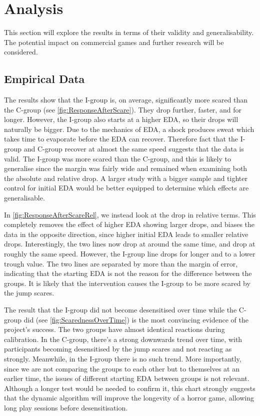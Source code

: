 \documentclass[12pt,a4paper]{article}\usepackage[]{graphicx}\usepackage[]{color}
\begin{document}
\section{Analysis}
\label{sec:Analysis}

This section will explore the results in terms of their validity and generalisability.
The potential impact on commercial games and further research will be considered.

\subsection{Empirical Data}

The results show that the I-group is, on average, significantly more scared than the C-group (see \vref{fig:ResponseAfterScare}).
They drop further, faster, and for longer.
However, the I-group also starts at a higher EDA, so their drops will naturally be bigger.
Due to the mechanics of EDA, a shock produces sweat which takes time to evaporate before the EDA can recover.
Therefore fact that the I-group and C-group recover at almost the same speed suggests that the data is valid.
The I-group was more scared than the C-group, and this is likely to generalise since the margin was fairly wide and remained when examining both the absolute and relative drop.
A larger study with a bigger sample and tighter control for initial EDA would be better equipped to determine which effects are generalisable.

In \vref{fig:ResponseAfterScareRel}, we instead look at the drop in relative terms.
This completely removes the effect of higher EDA showing larger drops, and biases the data in the opposite direction, since higher initial EDA leads to smaller relative drops.
Interestingly, the two lines now drop at around the same time, and drop at roughly the same speed.
However, the I-group line drops for longer and to a lower trough value.
The two lines are separated by more than the margin of error, indicating that the starting EDA is not the reason for the difference between the groups.
It is likely that the intervention causes the I-group to be more scared by the jump scares.

The result that the I-group did not become desensitised over time while the C-group did (see \vref{fig:ScarednessOverTime}) is the most convincing evidence of the project's success.
The two groups have almost identical reactions during calibration.
In the C-group, there's a strong downwards trend over time, with participants becoming desensitised by the jump scares and not reacting as strongly.
Meanwhile, in the I-group there is no such trend.
More importantly, since we are not comparing the groups to each other but to themselves at an earlier time, the issues of different starting EDA between groups is not relevant.
Although a longer test would be needed to confirm it, this chart strongly suggests that the dynamic algorithm will improve the longevity of a horror game, allowing long play sessions before desensitisation.
\end{document}
